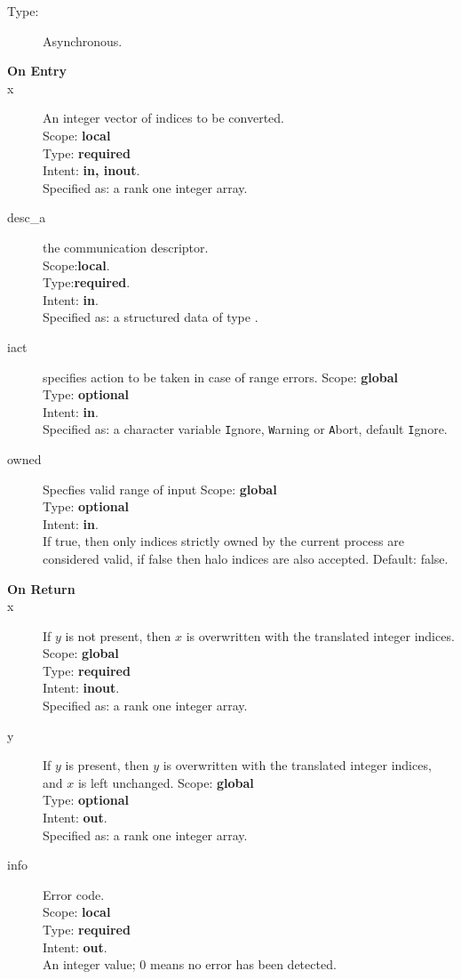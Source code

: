 \begin{description}
\item[Type:] Asynchronous.
\item[\bf On Entry]
\item[x] An integer vector of indices to be converted.\\
Scope: {\bf local} \\
Type: {\bf required}\\
Intent: {\bf in, inout}.\\
Specified as: a rank one integer array.\\
\item[desc\_a] the communication descriptor.\\
Scope:{\bf local}.\\
Type:{\bf required}.\\
Intent: {\bf in}.\\
Specified as: a structured data of type \descdata.
\item[iact] specifies action to be taken in case of range errors. 
Scope: {\bf global} \\
Type: {\bf optional}\\
Intent: {\bf in}.\\
Specified as: a character variable  \verb|I|gnore, \verb|W|arning or
\verb|A|bort, default \verb|I|gnore.
\item[owned] Specfies valid range of input 
Scope: {\bf global} \\
Type: {\bf optional}\\
Intent: {\bf in}.\\
If true, then only indices strictly owned by the current process are
considered valid, if false then halo indices are also
accepted. Default: false. 
\end{description}

\begin{description}
\item[\bf On Return]
\item[x] If $y$ is not present,
  then $x$ is overwritten with the translated integer indices. 
Scope: {\bf global} \\
Type: {\bf required}\\
Intent: {\bf inout}.\\
Specified as: a rank one integer array.
\item[y] If $y$ is  present,
  then $y$ is overwritten with the translated integer indices, and $x$
  is left unchanged. 
Scope: {\bf global} \\
Type: {\bf optional}\\
Intent: {\bf out}.\\
Specified as: a rank one integer array.
\item[info] Error code.\\
Scope: {\bf local} \\
Type: {\bf required} \\
Intent: {\bf out}.\\
An integer value; 0 means no error has been detected. 
\end{description}

